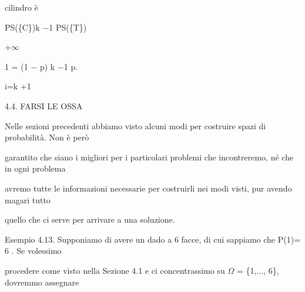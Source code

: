 \documentclass[a4paper,portrait,12pt]{article}
\begin{document}
\begin{flushleft}
cilindro \`{e}
\end{flushleft}


\begin{flushleft}
PS(\{C\})k $-$1 PS(\{T\})
\end{flushleft}





+$\infty$





\begin{flushleft}
1 = (1 $-$ p) k $-$1 p.
\end{flushleft}





\begin{flushleft}
i=k +1
\end{flushleft}





\begin{flushleft}
4.4. FARSI LE OSSA
\end{flushleft}


\begin{flushleft}
Nelle sezioni precedenti abbiamo visto alcuni modi per costruire spazi di probabilit\`{a}. Non \`{e} per\`{o}
\end{flushleft}


\begin{flushleft}
garantito che siano i migliori per i particolari problemi che incontreremo, n\'{e} che in ogni problema
\end{flushleft}


\begin{flushleft}
avremo tutte le informazioni necessarie per costruirli nei modi visti, pur avendo magari tutto
\end{flushleft}


\begin{flushleft}
quello che ci serve per arrivare a una soluzione.
\end{flushleft}


\begin{flushleft}
Esempio 4.13. Supponiamo di avere un dado a 6 facce, di cui sappiamo che P(1)= 6 . Se volessimo
\end{flushleft}


\begin{flushleft}
procedere come visto nella Sezione 4.1 e ci concentrassimo su $\Omega$ = \{1,..., 6\}, dovremmo assegnare
\end{flushleft}
\end{document}

